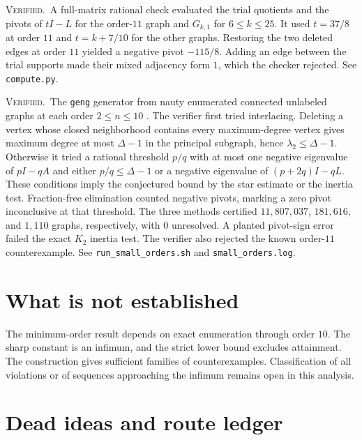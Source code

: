 \documentclass[11pt,a4paper]{article}
\newcommand{\verified}{\textsc{Verified.}}
\begin{document}
\verified\ A full-matrix rational check evaluated the trial quotients and the pivots of $tI-L$ for the order-$11$ graph and $G_{k,1}$ for $6\le k\le25$. It used $t=37/8$ at order $11$ and $t=k+7/10$ for the other graphs. Restoring the two deleted edges at order $11$ yielded a negative pivot $-115/8$. Adding an edge between the trial supports made their mixed adjacency form $1$, which the checker rejected. See \texttt{compute.py}.

\verified\ The \texttt{geng} generator from nauty enumerated connected unlabeled graphs at each order $2\le n\le10$ \cite{nauty}. The verifier first tried interlacing. Deleting a vertex whose closed neighborhood contains every maximum-degree vertex gives maximum degree at most $\Delta-1$ in the principal subgraph, hence $\lambda_2\le\Delta-1$. Otherwise it tried a rational threshold $p/q$ with at most one negative eigenvalue of $pI-qA$ and either $p/q\le\Delta-1$ or a negative eigenvalue of $(p+2q)I-qL$. These conditions imply the conjectured bound by the star estimate or the inertia test. Fraction-free elimination counted negative pivots, marking a zero pivot inconclusive at that threshold. The three methods certified $11{,}807{,}037$, $181{,}616$, and $1{,}110$ graphs, respectively, with $0$ unresolved. A planted pivot-sign error failed the exact $K_2$ inertia test. The verifier also rejected the known order-$11$ counterexample. See \texttt{run\_small\_orders.sh} and \texttt{small\_orders.log}.

\section{What is not established}

The minimum-order result depends on exact enumeration through order $10$. The sharp constant is an infimum, and the strict lower bound excludes attainment. The construction gives sufficient families of counterexamples. Classification of all violations or of sequences approaching the infimum remains open in this analysis.

\appendix
\section{Dead ideas and route ledger}
\end{document}
